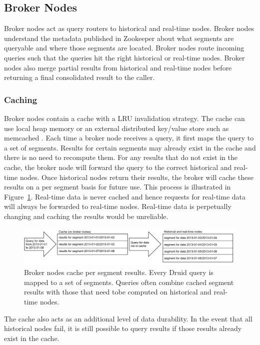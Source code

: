 \documentclass{acm_proc_article-sp}
\begin{document}
\subsection{Broker Nodes}
Broker nodes act as query routers to historical and real-time nodes. Broker
nodes understand the metadata published in Zookeeper about what segments are
queryable and where those segments are located. Broker nodes route incoming queries
such that the queries hit the right historical or real-time nodes. Broker nodes
also merge partial results from historical and real-time nodes before returning
a final consolidated result to the caller.  

\subsubsection{Caching}
\label{sec:caching}
Broker nodes contain a cache with a LRU \cite{o1993lru, kim2001lrfu}
invalidation strategy. The cache can use local heap memory or an external
distributed key/value store such as memcached
\cite{fitzpatrick2004distributed}. Each time a broker node receives a query, it
first maps the query to a set of segments. Results for certain segments may
already exist in the cache and there is no need to recompute them. For any
results that do not exist in the cache, the broker node will forward the query
to the correct historical and real-time nodes.  Once historical nodes return
their results, the broker will cache these results on a per segment basis for
future use. This process is illustrated in Figure~\ref{fig:caching}. Real-time
data is never cached and hence requests for real-time data will always be
forwarded to real-time nodes.  Real-time data is perpetually changing and
caching the results would be unreliable.

\begin{figure}
\centering
\includegraphics[width = 4.5in]{caching}
\caption{Broker nodes cache per segment results. Every Druid query is mapped to
a set of segments. Queries often combine cached segment results with those that
need tobe computed on historical and real-time nodes.}
\label{fig:caching}
\end{figure}

The cache also acts as an additional level of data durability. In the event
that all historical nodes fail, it is still possible to query results if those
results already exist in the cache.
\end{document}
